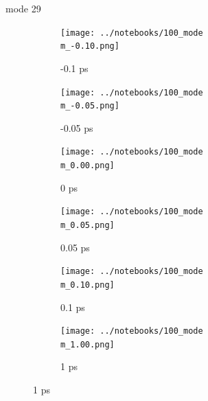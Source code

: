 \documentclass{beamer}
\begin{document}
\renewcommand\m{29}
\begin{frame}{mode \m}
	\begin{figure}
		\centering
		\begin{subfigure}[b]{\w\textwidth}
			\centering
			\texttt{[image: ../notebooks/100\_mode\\m\_-0.10.png]}
			\caption{-0.1 ps}
		\end{subfigure}
		\begin{subfigure}[b]{\w\textwidth}
			\centering
			\texttt{[image: ../notebooks/100\_mode\\m\_-0.05.png]}
			\caption{-0.05 ps}
		\end{subfigure}
		\begin{subfigure}[b]{\w\textwidth}
			\centering
			\texttt{[image: ../notebooks/100\_mode\\m\_0.00.png]}
			\caption{0 ps}
		\end{subfigure}
		\begin{subfigure}[b]{\w\textwidth}
			\centering
			\texttt{[image: ../notebooks/100\_mode\\m\_0.05.png]}
			\caption{0.05 ps}
		\end{subfigure}
		\begin{subfigure}[b]{\w\textwidth}
			\centering
			\texttt{[image: ../notebooks/100\_mode\\m\_0.10.png]}
			\caption{0.1 ps}
		\end{subfigure}
		\begin{subfigure}[b]{\w\textwidth}
			\centering
			\texttt{[image: ../notebooks/100\_mode\\m\_1.00.png]}
			\caption{1 ps}
		\end{subfigure}
	\end{figure}
\end{frame}
\end{document}
